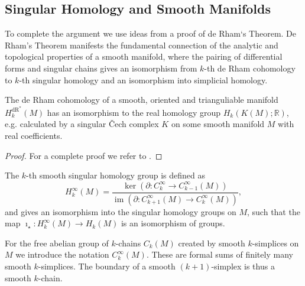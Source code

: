 \documentclass[envcountsect,runningheads]{llncs}
\DeclareMathOperator{\Ima}{im}
\begin{document}
\subsection{Singular Homology and Smooth Manifolds}
To complete the argument we use ideas from a proof of de Rham`s Theorem. De Rham's Theorem manifests the fundamental connection of the analytic and topological properties of a smooth manifold, where the pairing of differential forms and singular chains gives an isomorphism from $k$-th de Rham cohomology to $k$-th singular homology and an isomorphism into simplicial homology.

\begin{theorem} The de Rham cohomology of a smooth, oriented and trianguliable manifold $H_{k}^{\text{dR}^{*}}(M)$ has an isomorphism to the real homology group $H_k(K(M);\mathbb{R})$, e.g. calculated by a singular \v{C}ech complex $K$ on some smooth manifold $M$ with real coefficients.
\end{theorem}

\begin{proof}
For a complete proof we refer to  \cite[Chap.~18, Sect.~V.9]{lee2013smooth,bredon2013topology}.
\end{proof}

\begin{theorem}
\label{singularsmoothhomgroup}
The $k$-th smooth singular homology group is defined as
\begin{equation}
	H_{k}^{\infty} (M) = \frac{\ker\left(\partial: C_{k}^{\infty} \rightarrow C_{k-1}^{\infty}\left(M\right)\right)}{\Ima\left(\partial: C_{k+1}^{\infty}\left(M\right) \rightarrow C_{k}^{\infty}\left(M\right)\right)},
\end{equation}
and gives an isomorphism into the singular homology groups on $M$, such that the map $\imath_{\star}: H_{k}^{\infty}(M) \rightarrow H_k(M)$ is an isomorphism of groups.
\end{theorem}

\begin{remarktheo}
For the free abelian group of $k$-chains $C_k(M)$ created by smooth $k$-simplices on $M$ we introduce the notation $C_k^{\infty}(M)$. These are formal sums of finitely many smooth $k$-simplices. The boundary of a smooth $(k+1)$-simplex is thus a smooth $k$-chain.
\end{remarktheo}
\end{document}
